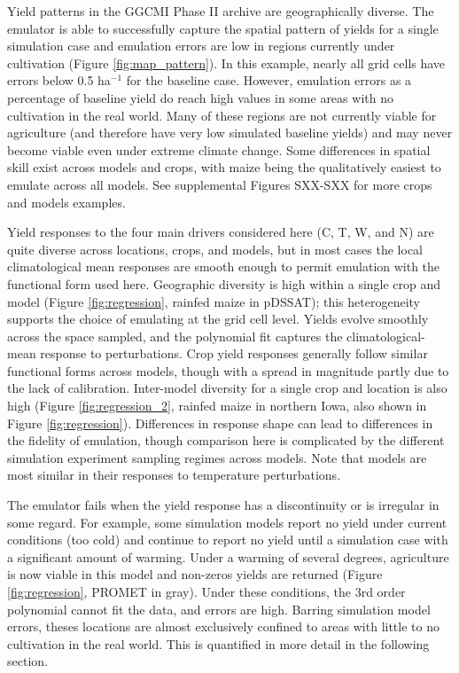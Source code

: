 \documentclass[gmd, manuscript]{copernicus} %
\begin{document}
Yield patterns in the GGCMI Phase II archive are geographically diverse. 
The emulator is able to successfully capture the spatial pattern of yields for a single simulation case and emulation errors are low in regions currently under cultivation (Figure \ref{fig:map_pattern}). 
In this example, nearly all grid cells have errors below 0.5 ha$^{-1}$ for the baseline case. 
However, emulation errors as a percentage of baseline yield do reach high values in some areas with no cultivation in the real world.
Many of these regions are not currently viable for agriculture (and therefore have very low simulated baseline yields) and may never become viable even under extreme climate change.  
Some differences in spatial skill exist across models and crops, with maize being the qualitatively easiest to emulate across all models.  
See supplemental Figures SXX-SXX for more crops and models examples. 

Yield responses to the four main drivers considered here (C, T, W, and N) are quite diverse across locations, crops, and models, but in most cases the local climatological mean responses are smooth enough to permit emulation with the functional form used here.
Geographic diversity is high within a single crop and model (Figure \ref{fig:regression}, rainfed maize in pDSSAT); this heterogeneity supports the choice of emulating at the grid cell level. 
Yields evolve smoothly across the space sampled, and the polynomial fit captures the climatological-mean response to perturbations. 
Crop yield responses generally follow similar functional forms across models, though with a spread in magnitude partly due to the lack of calibration. 
Inter-model diversity for a single crop and location is also high (Figure \ref{fig:regression_2}, rainfed maize in northern Iowa, also shown in Figure \ref{fig:regression}). 
Differences in response shape can lead to  differences in the fidelity of emulation, though comparison here is complicated by the different simulation experiment sampling regimes across models. 
Note that models are most similar in their responses to temperature perturbations. 

The emulator fails when the yield response has a discontinuity or is irregular in some regard. 
For example, some simulation models report no yield under current conditions (too cold) and continue to report no yield until a simulation case with a significant amount of warming. 
Under a warming of several degrees, agriculture is now viable in this model and non-zeros yields are returned (Figure \ref{fig:regression}, PROMET in gray). 
Under these conditions, the 3rd order polynomial cannot fit the data, and errors are high. 
Barring simulation model errors, theses locations are almost exclusively confined to areas with little to no cultivation in the real world. 
This is quantified in more detail in the following section.
\end{document}
